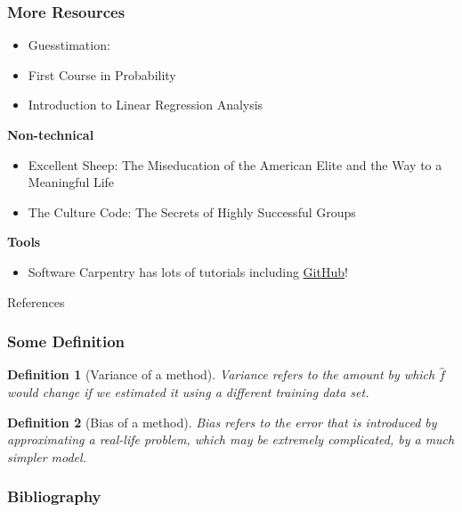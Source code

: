 \documentclass[serif, xcolor={dvipsnames}]{beamer} %
\newtheorem{deff}{Definition}
\begin{document}


\begin{frame}[t]
\frametitle{More Resources}

\begin{itemize}
\item {\scriptsize Guesstimation:~\citep{weinstein2008guesstimation}}
\item {\scriptsize First Course in Probability~\citep{ross1976first}}
\item {\scriptsize Introduction to Linear Regression Analysis~\citep{montgomery2021introduction}}
\end{itemize}
{\bf \scriptsize  Non-technical}
\begin{itemize}
\item {\scriptsize Excellent Sheep: The Miseducation of the American Elite and the Way to a Meaningful Life~\citep{sheep}}
\item {\scriptsize The Culture Code: The Secrets of Highly Successful Groups~\citep{CultureCode}}
\end{itemize}

{\bf \scriptsize  Tools}
\begin{itemize}
\item {\scriptsize Software Carpentry has lots of tutorials including \href{https://swcarpentry.github.io/git-novice/}{GitHub}!}
\end{itemize}
\end{frame}


\begin{frame}[allowframebreaks,t]{References} 
\frametitle{Some Definition}


\begin{deff}[Variance of a method] Variance refers to the amount by which
$\hat f$ would change if we estimated it using a different training data set.
\end{deff}
\pause
\begin{deff}[Bias of a method] Bias refers to the error that is introduced by approximating a real-life problem, which may be extremely complicated, by a much simpler model.
\end{deff}

\end{frame}

\begin{frame}
\frametitle{Bibliography}
\nocite{*}
\printbibliography

\end{frame}
\end{document}
